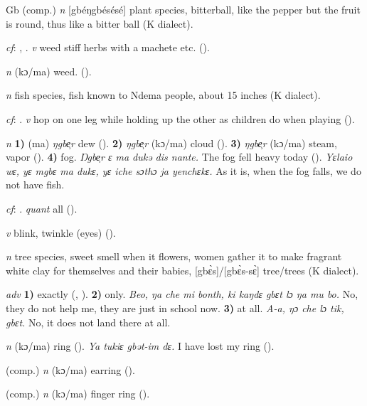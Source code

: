 \begin{letter}{Gb}
 (comp.) \textit{n} [gbéŋgbésésé] plant species, bitterball, like the pepper but the fruit is round, thus like a bitter ball (K dialect).

 \textit{cf}: , . \textit{v} weed stiff herbs with a machete etc. (\citealt{Pichl1967}).

 \textit{n} (kɔ/ma) weed. (\citealt{Pichl1967}). 

 \textit{n} fish species, fish known to Ndema people, about 15 inches (K dialect). 

 \textit{cf}: . \textit{v} hop on one leg while holding up the other as children do when playing (\citealt{Pichl1967}).

 \textit{n} \textbf{1)} (ma) \textit{ŋgbe̹r} dew (\citealt{Pichl1967}). \textbf{2)} \textit{ŋgbe̹r} (kɔ/ma) cloud (\citealt{Pichl1967}). \textbf{3)} \textit{ŋgbe̹r} (kɔ/ma) steam, vapor (\citealt{Pichl1967}). \textbf{4)} fog. \textit{Ŋgbe̹r ɛ ma dukə dis nante.} The fog fell heavy today (\citealt{Pichl1967}). \textit{Yɛlaio wɛ, yɛ mgbɛ ma dukɛ, yɛ iche sɔthɔ ja yenchɛkɛ.} As it is, when the fog falls, we do not have fish.

 \textit{cf}: . \textit{quant} all (\citealt{Sumner1921}).

 \textit{v} blink, twinkle (eyes) (\citealt{Pichl1967}). 

 \textit{n} tree species, sweet smell when it flowers, women gather it to make fragrant white clay for themselves and their babies, [gbɛ̀s]/[gbɛ̀s-sɛ̀] tree/trees (K dialect). 

 \textit{adv} \textbf{1)} exactly (\citealt{Pichl1967}, \citealt{Sumner1921}). \textbf{2)} only. \textit{Beo, ŋa che mi bonth, ki kaŋdɛ gbɛt lɔ ŋa mu bo.} No, they do not help me, they are just in school now. \textbf{3)} at all. \textit{A-a, ŋɔ che lɔ tik, gbɛt.} No, it does not land there at all. 

 \textit{n} (kɔ/ma) ring (\citealt{Pichl1967}). \textit{Ya tukiɛ gbət-im dɛ.} I have lost my ring (\citealt{Pichl1967}). 

 (comp.) \textit{n} (kɔ/ma) earring (\citealt{Pichl1967}). 

 (comp.) \textit{n} (kɔ/ma) finger ring (\citealt{Pichl1967}). 


\end{letter}
